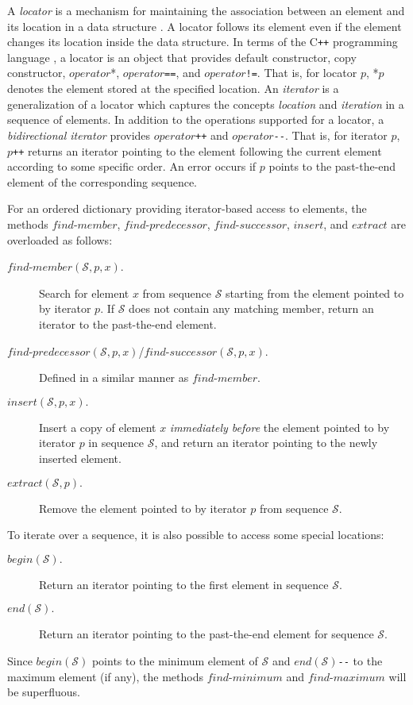 \documentclass{DIKU-article}
\newcommand{\Findmin}{\mbox{$\mathit{find}$\textnormal{-}}\allowbreak{}\mbox{$\mathit{minimum}$}}
\newcommand{\Findmax}{\mbox{$\mathit{find}$\textnormal{-}}\allowbreak{}\mbox{$\mathit{maximum}$}}
\newcommand{\Member}{\mbox{$\mathit{find}$\textnormal{-}}\allowbreak{}\mbox{$\mathit{member}$}}
\newcommand{\Predecessor}{\mbox{$\mathit{find}$\textnormal{-}}\allowbreak{}\mbox{$\mathit{predecessor}$}}
\newcommand{\Successor}{\mbox{$\mathit{find}$\textnormal{-}}\allowbreak{}\mbox{$\mathit{successor}$}}
\newcommand{\Insert}{\mbox{$\mathit{insert}$}}
\newcommand{\Extract}{\mbox{$\mathit{extract}$}}
\newcommand{\Begin}{\mbox{$\mathit{begin}$}}
\newcommand{\End}{\mbox{$\mathit{end}$}}
\newcommand{\Operator}{\mbox{$\mathit{operator}$}}
\begin{document}
A \emph{locator} is a mechanism for maintaining the association
between an element and its location in a data structure \cite[Section
6.4]{GT98}. A locator follows its element even if the element changes
its location inside the data structure. In terms of the C\texttt{++}
programming language \cite{ISO}, a locator is an object that provides
default constructor, copy constructor, \Operator{}*,
\Operator{}\texttt{==}, and \Operator{}\texttt{!=}. That is, for
locator $p$, *$p$ denotes the element stored at the specified
location.  An \emph{iterator} is a generalization of a locator which
captures the concepts \textit{location} and \textit{iteration} in a
sequence of elements. In addition to the operations supported for a
locator, a \emph{bidirectional iterator} provides
\Operator{}\texttt{++} and \Operator{}\texttt{-}\texttt{-}. That is,
for iterator $p$, $p$\texttt{++} returns an iterator pointing to the
element following the current element according to some
specific order. An error occurs if $p$ points to the past-the-end
element of the corresponding sequence.

For an ordered dictionary providing iterator-based access to elements,
the methods \Member{}, \Predecessor{}, \Successor{}, \Insert{}, and
\Extract{} are overloaded as follows:
\begin{description}
\item[\Member{}$(\mathcal{S}, p, x).$] Search for element $x$ from sequence $\mathcal{S}$
starting from the element pointed to by iterator $p$.
If $\mathcal{S}$ does not contain any
matching member, return an iterator to the past-the-end element.

\item[\Predecessor{}$(\mathcal{S}, p, x)$/\Successor{}$(\mathcal{S}, p, x).$] Defined in a
similar manner as \Member{}.

\item[\Insert{}$(\mathcal{S}, p, x).$] Insert a copy of element $x$
\emph{immediately before} the element pointed to by iterator $p$ in
sequence $\mathcal{S}$, and return an iterator pointing to the newly inserted element.

\item[\Extract{}$(\mathcal{S}, p).$] Remove the element pointed to by iterator $p$
from sequence $\mathcal{S}$.
\end{description}
To iterate over a sequence, it is also possible to access some special
locations:
\begin{description}
\item[\Begin{}$(\mathcal{S}).$] Return an iterator pointing to the first element
in sequence $\mathcal{S}$.

\item[\End{}$(\mathcal{S}).$] Return an iterator pointing to the past-the-end
element for sequence $\mathcal{S}$.
\end{description}
Since \Begin$(\mathcal{S})$ points to the minimum element of $\mathcal{S}$ and
\End$(\mathcal{S})$\texttt{-}\texttt{-} to the maximum element (if any),
the methods \Findmin{} and \Findmax{} will be superfluous.
\end{document}
